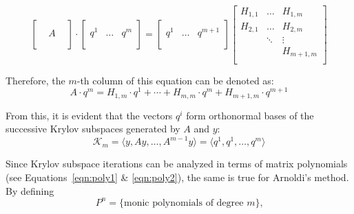 \begin{equation}
  \left[
    \begin{array}{ccc}
      &  & \\
      & A & \\
      &  & \\
    \end{array}
  \right] \cdot
  \left[
    \begin{array}{c|c|c}
      & & \\
      q^1 &\dots & q^m \\
      & & \\
    \end{array}
  \right] = 
  \left[
    \begin{array}{c|c|c}
      & & \\
      q^1 &\dots & q^{m+1} \\
      & & \\
    \end{array}
  \right]
  \left[
    \begin{array}{ccc}
      H_{1,1} & \dots & H_{1,m} \\
      H_{2,1} & \dots &  H_{2,m}\\
      & \ddots & \vdots \\
      & & H_{m+1, m}  \\
    \end{array}
  \right] 
\end{equation}

\noindent Therefore, the $m$-th column of this equation can be denoted as:
\begin{equation}
    A \cdot q^m = H_{1,m}\cdot q^1+ \cdots + H_{m,m}\cdot q^m + H_{m+1,m}\cdot q^{m+1}
\end{equation}

\noindent From this, it is evident that the vectors $q^i$ form orthonormal bases of the successive Krylov subspaces generated by $A$ and $y$:
\begin{equation}
\label{eqn:krylov_space}
    \mathcal{K}_m=\langle y, Ay, \dots , A^{m-1}y\rangle = \langle q^1,q^1, \dots , q^{m}\rangle
\end{equation}

\noindent Since Krylov subspace iterations can be analyzed in terms of matrix polynomials (see Equations~\hyperref[eqn:poly1]{\ref{eqn:poly1}} \& \hyperref[eqn:poly2]{\ref{eqn:poly2}}), the same is true for Arnoldi's method. By defining 
\begin{equation}
\label{eqn:arnoldi_poly}
    P^n = \{\text{monic polynomials of degree }m\}\text{,}
\end{equation}


